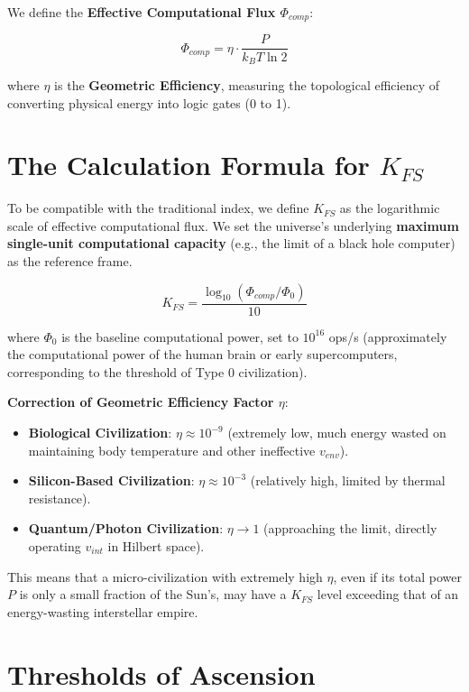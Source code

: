 We define the \textbf{Effective Computational Flux $\Phi_{comp}$}:

\[\Phi_{comp} = \eta \cdot \frac{P}{k_B T \ln 2}\]

where $\eta$ is the \textbf{Geometric Efficiency}, measuring the topological efficiency of converting physical energy into logic gates (0 to 1).

\section{The Calculation Formula for $K_{FS}$}

To be compatible with the traditional index, we define $K_{FS}$ as the logarithmic scale of effective computational flux. We set the universe's underlying \textbf{maximum single-unit computational capacity} (e.g., the limit of a black hole computer) as the reference frame.

\[K_{FS} = \frac{\log_{10} (\Phi_{comp} / \Phi_0)}{10}\]

where $\Phi_0$ is the baseline computational power, set to $10^{16}$ ops/s (approximately the computational power of the human brain or early supercomputers, corresponding to the threshold of Type 0 civilization).

\textbf{Correction of Geometric Efficiency Factor $\eta$}:

\begin{itemize}
\item \textbf{Biological Civilization}: $\eta \approx 10^{-9}$ (extremely low, much energy wasted on maintaining body temperature and other ineffective $v_{env}$).

\item \textbf{Silicon-Based Civilization}: $\eta \approx 10^{-3}$ (relatively high, limited by thermal resistance).

\item \textbf{Quantum/Photon Civilization}: $\eta \to 1$ (approaching the limit, directly operating $v_{int}$ in Hilbert space).
\end{itemize}

This means that a micro-civilization with extremely high $\eta$, even if its total power $P$ is only a small fraction of the Sun's, may have a $K_{FS}$ level exceeding that of an energy-wasting interstellar empire.

\section{Thresholds of Ascension}

